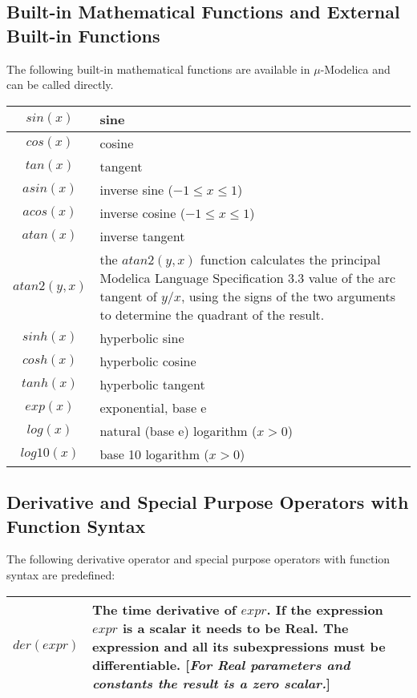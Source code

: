 \documentclass[11pt,a4paper,notitlepage]{report}
\begin{document}
\subsection{Built-in Mathematical Functions and External Built-in Functions}
The following built-in mathematical functions are available in $\mu$-Modelica and can be called directly.
\begin{center}
\begin{tabular}{|c|p{3in}|}
	\hline
	$sin(x)$ & sine \\	
	\hline
	$cos(x)$ & cosine \\
	\hline
	$tan(x)$ & tangent \\ %
	\hline 	 
	$asin(x)$ & inverse sine ($-1 ≤ x ≤ 1$) \\
	\hline
	$acos(x)$	& inverse cosine ($-1 ≤ x ≤ 1$) \\
	\hline
	$atan(x)$ & inverse tangent \\	    	 
	\hline
	$atan2(y, x)$ & the $atan2(y, x)$ function calculates the principal Modelica Language Specification 3.3
value of the arc tangent of $y/x$, using the signs
of the
two arguments to determine the quadrant of
the result. \\
	\hline
	$sinh(x)$ & hyperbolic sine \\
	\hline
	$cosh(x)$ & hyperbolic cosine \\
	\hline
	$tanh(x)$ & hyperbolic tangent \\
	\hline
	$exp(x)$ & exponential, base e \\
	\hline
	$log(x)$ & natural (base e) logarithm ($x > 0$) \\
	\hline
	$log10(x)$ & base 10 logarithm ($x > 0$) \\
	\hline	
\end{tabular}
\end{center}

\subsection{Derivative and Special Purpose Operators with Function Syntax}
The following derivative operator and special purpose operators with function syntax are predefined:
\begin{center}
\begin{tabular}{|c|p{3in}|}
	\hline
	$der(expr)$ & The time derivative of $expr$. If the expression $expr$ is a scalar it needs to
be Real. The expression and all its subexpressions must be differentiable. [\emph{For Real parameters and constants the result is a zero
scalar.}] \\
	\hline
\end{tabular}
\end{center}
\end{document}
